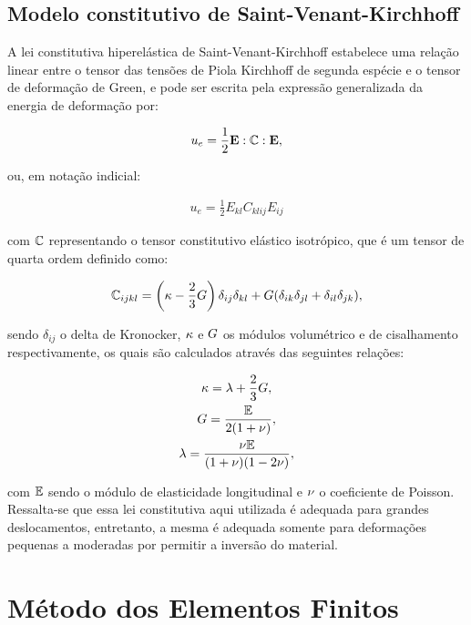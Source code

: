 \subsection{Modelo constitutivo de Saint-Venant-Kirchhoff}

A lei constitutiva hiperelástica de Saint-Venant-Kirchhoff estabelece uma relação linear entre o tensor das tensões de Piola Kirchhoff de segunda espécie e o tensor de deformação de Green, e pode ser escrita pela expressão generalizada da energia de deformação por:

\begin{align}
u_{e} = \frac{1}{2} \mathbf{E} : \mathbb{C} : \mathbf{E},
\end{align}

\noindent ou, em notação indicial:

\begin{align}
u_{e} = \frac{1}{2} E_{kl} C_{klij} E_{ij}
\end{align}

\noindent com $\mathbb{C}$ representando o tensor constitutivo elástico isotrópico, que é um tensor de quarta ordem definido como:

\begin{gather}
\mathbb{C}_{ijkl}=\left(\kappa - \frac{2}{3}G \right)\delta_{ij}\delta_{kl} + G(\delta_{ik}\delta_{jl}+\delta_{il}\delta_{jk}),
\end{gather}

\noindent sendo $\delta_{ij}$ o delta de Kronocker, $\kappa$ e $G$ os módulos volumétrico e de cisalhamento respectivamente, os quais são calculados através das seguintes relações:

\begin{gather}
\kappa=\lambda+\frac{2}{3}G,\\
G=\frac{\mathbb{E}}{2(1+\nu)},\\
\lambda=\frac{\nu \mathbb{E}}{(1+\nu)(1-2\nu)},
\end{gather}

\noindent com $\mathbb{E}$ sendo o módulo de elasticidade longitudinal e $\nu$ o coeficiente de Poisson. Ressalta-se que essa lei constitutiva aqui utilizada é adequada para grandes deslocamentos, entretanto, a mesma é adequada somente para deformações pequenas a moderadas por permitir a inversão do material.

\section{Método dos Elementos Finitos}

